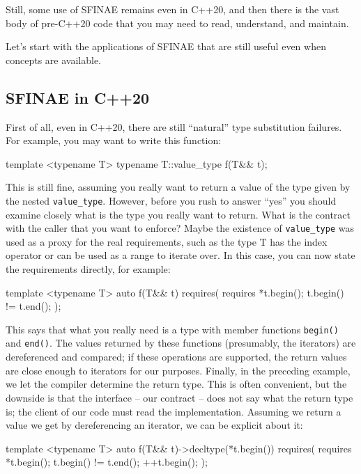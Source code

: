 Still, some use of SFINAE remains even in C++20, and then there is the vast body of pre-C++20 code that you may need to read, understand, and maintain.

Let's start with the applications of SFINAE that are still useful even when concepts are available.

\subsection{SFINAE in C++20}

First of all, even in C++20, there are still ``natural'' type substitution failures. For example, you may want to write this function:

\begin{code}
template <typename T> typename T::value_type f(T&& t);
\end{code}

This is still fine, assuming you really want to return a value of the type given by the nested \texttt{value\_type}. However, before you rush to answer ``yes'' you should examine closely what is the type you really want to return. What is the contract with the caller that you want to enforce? Maybe the existence of \texttt{value\_type} was used as a proxy for the real requirements, such as the type T has the index operator or can be used as a range to iterate over. In this case, you can now state the requirements directly, for example:

\begin{code}
template <typename T> auto f(T&& t)
requires( requires { *t.begin(); t.begin() != t.end(); } );
\end{code}

This says that what you really need is a type with member functions \texttt{begin()} and \texttt{end()}. The values returned by these functions (presumably, the iterators) are dereferenced and compared; if these operations are supported, the return values are close enough to iterators for our purposes. Finally, in the preceding example, we let the compiler determine the return type. This is often convenient, but the downside is that the interface -- our contract -- does not say what the return type is; the client of our code must read the implementation. Assuming we return a value we get by dereferencing an iterator, we can be explicit about it:

\begin{code}
template <typename T> auto f(T&& t)->decltype(*t.begin())
requires( requires {
  *t.begin();
  t.begin() != t.end();
  ++t.begin();
} );
\end{code}

